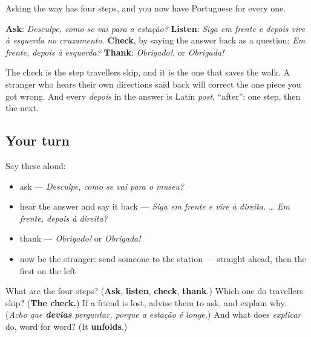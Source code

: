 \begin{grammarlens}[title={What you've built}]
Asking the way has four steps, and you now have Portuguese for every one.

\textbf{Ask}: \emph{Desculpe, como se vai para a estação?} \textbf{Listen}: \emph{Siga em frente e depois vire à esquerda no cruzamento.} \textbf{Check}, by saying the answer back as a question: \emph{Em frente, depois à esquerda?} \textbf{Thank}: \emph{Obrigado!}, or \emph{Obrigada!}

The check is the step travellers skip, and it is the one that saves the walk. A stranger who hears their own directions said back will correct the one piece you got wrong. And every \emph{depois} in the answer is Latin \emph{post}, \textquotedblleft{}after\textquotedblright{}: one step, then the next.
\end{grammarlens}

\subsection*{Your turn}
Say these aloud:

\begin{itemize}
\raggedright
  \item ask — \emph{Desculpe, como se vai para o museu?}
  \item hear the answer and say it back — \emph{Siga em frente e vire à direita.} … \emph{Em frente, depois à direita?}
  \item thank — \emph{Obrigado!} or \emph{Obrigada!}
  \item now be the stranger: send someone to the station — straight ahead, then the first on the left
\end{itemize}

\begin{tcolorbox}[breakable,colback=teal!4,colframe=teal!35!black,title={Before you move on}]
What are the four steps? (\textbf{Ask}, \textbf{listen}, \textbf{check}, \textbf{thank}.) Which one do travellers skip? (\textbf{The check.}) If a friend is lost, advise them to ask, and explain why. (\emph{Acho que \textbf{devias} perguntar, porque a estação é longe.}) And what does \emph{explicar} do, word for word? (It \textbf{unfolds}.)
\end{tcolorbox}
